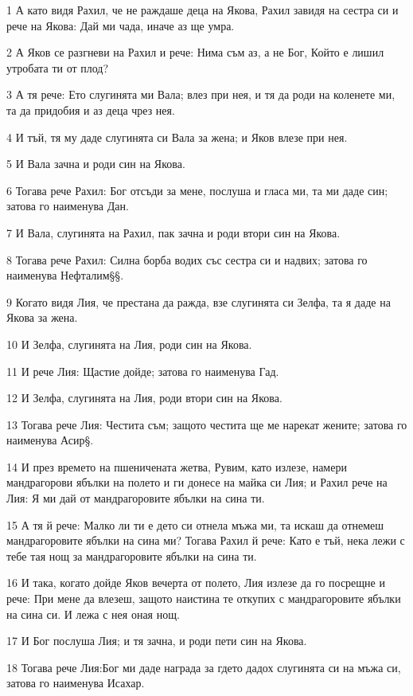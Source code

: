 \par 1 А като видя Рахил, че не раждаше деца на Якова, Рахил завидя на сестра си и рече на Якова: Дай ми чада, иначе аз ще умра.
\par 2 А Яков се разгневи на Рахил и рече: Нима съм аз, а не Бог, Който е лишил утробата ти от плод?
\par 3 А тя рече: Ето слугинята ми Вала; влез при нея, и тя да роди на коленете ми, та да придобия и аз деца чрез нея.
\par 4 И тъй, тя му даде слугинята си Вала за жена; и Яков влезе при нея.
\par 5 И Вала зачна и роди син на Якова.
\par 6 Тогава рече Рахил: Бог отсъди за мене, послуша и гласа ми, та ми даде син; затова го наименува Дан.
\par 7 И Вала, слугинята на Рахил, пак зачна и роди втори син на Якова.
\par 8 Тогава рече Рахил: Силна борба водих със сестра си и надвих; затова го наименува Нефталим§§.
\par 9 Когато видя Лия, че престана да ражда, взе слугинята си Зелфа, та я даде на Якова за жена.
\par 10 И Зелфа, слугинята на Лия, роди син на Якова.
\par 11 И рече Лия: Щастие дойде; затова го наименува Гад.
\par 12 И Зелфа, слугинята на Лия, роди втори син на Якова.
\par 13 Тогава рече Лия: Честита съм; защото честита ще ме нарекат жените; затова го наименува Асир§.
\par 14 И през времето на пшеничената жетва, Рувим, като излезе, намери мандрагорови ябълки на полето и ги донесе на майка си Лия; и Рахил рече на Лия: Я ми дай от мандрагоровите ябълки на сина ти.
\par 15 А тя й рече: Малко ли ти е дето си отнела мъжа ми, та искаш да отнемеш мандрагоровите ябълки на сина ми? Тогава Рахил й рече: Като е тъй, нека лежи с тебе тая нощ за мандрагоровите ябълки на сина ти.
\par 16 И така, когато дойде Яков вечерта от полето, Лия излезе да го посрещне и рече: При мене да влезеш, защото наистина те откупих с мандрагоровите ябълки на сина си. И лежа с нея оная нощ.
\par 17 И Бог послуша Лия; и тя зачна, и роди пети син на Якова.
\par 18 Тогава рече Лия:Бог ми даде награда за гдето дадох слугинята си на мъжа си, затова го наименува Исахар.
